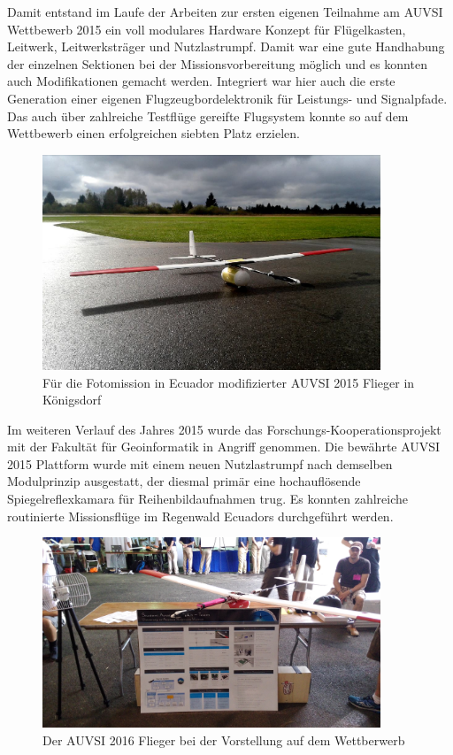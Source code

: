 Damit entstand im Laufe der Arbeiten zur ersten eigenen Teilnahme am AUVSI Wettbewerb 2015 ein voll modulares Hardware Konzept für Flügelkasten, Leitwerk, Leitwerksträger und Nutzlastrumpf.
Damit war eine gute Handhabung der einzelnen Sektionen bei der Missionsvorbereitung möglich und es konnten auch Modifikationen gemacht werden. Integriert war hier auch die erste Generation einer eigenen Flugzeugbordelektronik für Leistungs- und Signalpfade. Das auch über zahlreiche Testflüge gereifte Flugsystem konnte so auf dem Wettbewerb einen erfolgreichen siebten Platz erzielen.

\begin{figure}[H]
\centering
\includegraphics[width=0.9\textwidth]{bilder/Fotos/Ecuadorflieger_Koenigsdorf.png} 
\caption{Für die Fotomission in Ecuador modifizierter AUVSI 2015 Flieger in Königsdorf} 
\label{Für die Fotomission in Ecuador modifizierter AUVSI 2015 Flieger in Königsdorf}
\end{figure}

Im weiteren Verlauf des Jahres 2015 wurde das Forschungs-Kooperationsprojekt mit der Fakultät für Geoinformatik in Angriff genommen. Die bewährte AUVSI 2015 Plattform wurde mit einem neuen Nutzlastrumpf nach demselben Modulprinzip ausgestatt, der diesmal primär eine hochauflösende Spiegelreflexkamara für Reihenbildaufnahmen trug. Es konnten zahlreiche routinierte Missionsflüge im Regenwald Ecuadors durchgeführt werden.

\begin{figure}[H]
\centering
\includegraphics[width=0.9\textwidth]{bilder/Fotos/AUVSI_2016_Display.jpg} 
\caption{Der AUVSI 2016 Flieger bei der Vorstellung auf dem Wettberwerb} 
\label{Der AUVSI 2016 Flieger beim Display auf dem Wettberwerb}
\end{figure}

